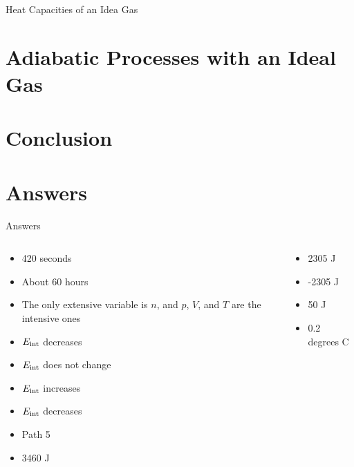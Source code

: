 \documentclass{beamer}
\begin{document}
\begin{frame}{Heat Capacities of an Idea Gas}

\end{frame}

\section{Adiabatic Processes with an Ideal Gas}

\section{Conclusion}

\section{Answers}

\begin{frame}{Answers}
\small
\begin{columns}[T]
\begin{column}{0.5\textwidth}
\begin{itemize}
\item 420 seconds
\item About 60 hours
\item The only extensive variable is $n$, and $p$, $V$, and $T$ are the intensive ones
\item $E_{\rm int}$ decreases
\item $E_{\rm int}$ does not change
\item $E_{\rm int}$ increases
\item $E_{\rm int}$ decreases
\item Path 5
\item 3460 J
\end{itemize}
\end{column}
\begin{column}{0.5\textwidth}
\begin{itemize}
\item 2305 J
\item -2305 J
\item 50 J
\item 0.2 degrees C
\end{itemize}
\end{column}
\end{columns}
\end{frame}
\end{document}
